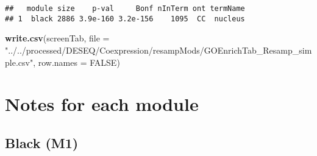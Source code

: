 \documentclass[]{article}
\newenvironment{Shaded}{\begin{snugshade}}{\end{snugshade}}
\newcommand{\CommentTok}[1]{\textcolor[rgb]{0.56,0.35,0.01}{\textit{#1}}}
\newcommand{\ControlFlowTok}[1]{\textcolor[rgb]{0.13,0.29,0.53}{\textbf{#1}}}
\newcommand{\DataTypeTok}[1]{\textcolor[rgb]{0.13,0.29,0.53}{#1}}
\newcommand{\DecValTok}[1]{\textcolor[rgb]{0.00,0.00,0.81}{#1}}
\newcommand{\KeywordTok}[1]{\textcolor[rgb]{0.13,0.29,0.53}{\textbf{#1}}}
\newcommand{\NormalTok}[1]{#1}
\newcommand{\OperatorTok}[1]{\textcolor[rgb]{0.81,0.36,0.00}{\textbf{#1}}}
\newcommand{\OtherTok}[1]{\textcolor[rgb]{0.56,0.35,0.01}{#1}}
\newcommand{\StringTok}[1]{\textcolor[rgb]{0.31,0.60,0.02}{#1}}
\begin{document}
\begin{verbatim}
##   module size    p-val     Bonf nInTerm ont termName
## 1  black 2886 3.9e-160 3.2e-156    1095  CC  nucleus
\end{verbatim}

\begin{Shaded}
\begin{Highlighting}[]
\KeywordTok{write.csv}\NormalTok{(screenTab, }\DataTypeTok{file =} \StringTok{"../../processed/DESEQ/Coexpression/resampMods/GOEnrichTab_Resamp_simple.csv"}\NormalTok{,}
              \DataTypeTok{row.names =} \OtherTok{FALSE}\NormalTok{)}
\end{Highlighting}
\end{Shaded}

\hypertarget{notes-for-each-module}{%
\section{Notes for each module}\label{notes-for-each-module}}

\begin{Shaded}
\end{Shaded}

\hypertarget{black-m1}{%
\subsection{Black (M1)}\label{black-m1}}
\end{document}
